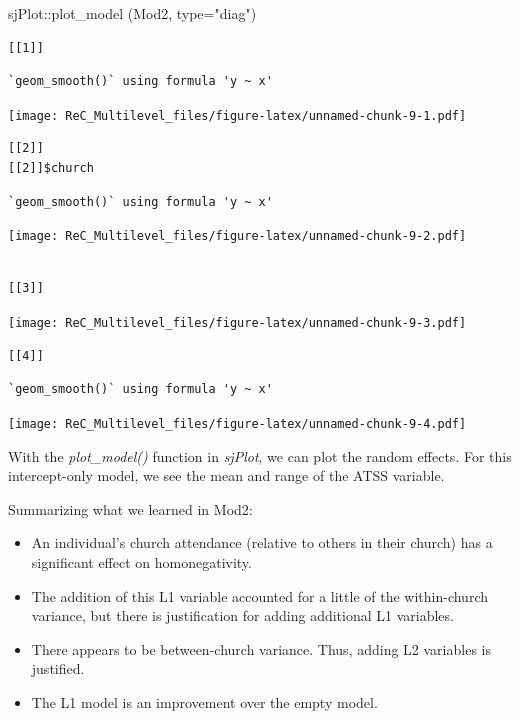 \documentclass[
  11pt,
]{book}
\newenvironment{Shaded}{\begin{snugshade}}{\end{snugshade}}
\newcommand{\AttributeTok}[1]{\textcolor[rgb]{0.77,0.63,0.00}{#1}}
\newcommand{\FunctionTok}[1]{\textcolor[rgb]{0.00,0.00,0.00}{#1}}
\newcommand{\NormalTok}[1]{#1}
\newcommand{\SpecialCharTok}[1]{\textcolor[rgb]{0.00,0.00,0.00}{#1}}
\newcommand{\StringTok}[1]{\textcolor[rgb]{0.31,0.60,0.02}{#1}}
\providecommand{\tightlist}{%
  \setlength{\itemsep}{0pt}\setlength{\parskip}{0pt}}
\begin{document}
\begin{Shaded}
\begin{Highlighting}[]
\NormalTok{sjPlot}\SpecialCharTok{::}\FunctionTok{plot\_model}\NormalTok{ (Mod2, }\AttributeTok{type=}\StringTok{"diag"}\NormalTok{)}
\end{Highlighting}
\end{Shaded}

\begin{verbatim}
[[1]]
\end{verbatim}

\begin{verbatim}
`geom_smooth()` using formula 'y ~ x'
\end{verbatim}

\texttt{[image: ReC\_Multilevel\_files/figure-latex/unnamed-chunk-9-1.pdf]}

\begin{verbatim}
[[2]]
[[2]]$church
\end{verbatim}

\begin{verbatim}
`geom_smooth()` using formula 'y ~ x'
\end{verbatim}

\texttt{[image: ReC\_Multilevel\_files/figure-latex/unnamed-chunk-9-2.pdf]}

\begin{verbatim}

[[3]]
\end{verbatim}

\texttt{[image: ReC\_Multilevel\_files/figure-latex/unnamed-chunk-9-3.pdf]}

\begin{verbatim}
[[4]]
\end{verbatim}

\begin{verbatim}
`geom_smooth()` using formula 'y ~ x'
\end{verbatim}

\texttt{[image: ReC\_Multilevel\_files/figure-latex/unnamed-chunk-9-4.pdf]}

With the \emph{plot\_model()} function in \emph{sjPlot}, we can plot the random effects. For this intercept-only model, we see the mean and range of the ATSS variable.

Summarizing what we learned in Mod2:

\begin{itemize}
\tightlist
\item
  An individual's church attendance (relative to others in their church) has a significant effect on homonegativity.
\item
  The addition of this L1 variable accounted for a little of the within-church variance, but there is justification for adding additional L1 variables.
\item
  There appears to be between-church variance. Thus, adding L2 variables is justified.
\item
  The L1 model is an improvement over the empty model.
\end{itemize}
\end{document}
